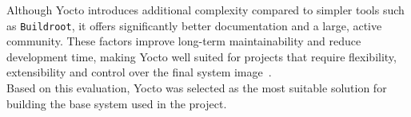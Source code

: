 Although Yocto introduces additional complexity compared to simpler tools such as \verb|Buildroot|,
it offers significantly better documentation and a large, active community.
These factors improve long-term maintainability and reduce development time, making Yocto
well suited for projects that require flexibility, extensibility and control over the final system image~\cite{yocto-manual}.\\

Based on this evaluation, Yocto was selected as the most suitable solution for building the base system used in the project.